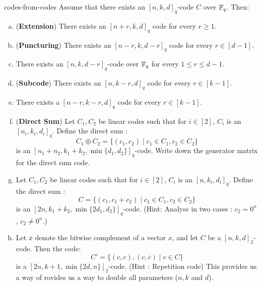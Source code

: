 \begin{exercise-prob}
\begin{show-ps5}{codes-from-codes}
Assume that there exists an $[n,k,d]_q$-code $C$ over
${\mathbb{F}}_q$. Then:
\begin{enumerate}[(a)]
\item ({\bf Extension}) There exists an $[n+r,k,d]_q$ code for every $r \ge 1$.
\item (\textbf{Puncturing}) There exists an $[n-r,k,d-r]_q$ code for every $r \in [d-1]$.
\item There exists an $[n,k,d-r]_q$-code over ${\mathbb{F}}_q$ for every $1 \le r \le d-1$.
\item ({\bf Subcode}) There exists an $[n,k-r,d]_q$ code for every $r \in [k-1]$.
\item There exists a $[n-r,k-r,d]_q$ code for every $r \in [k-1]$.
\item (\textbf{Direct Sum}) Let $C_1, C_2$ be linear codes such that for $i \in [2]$, $C_i$ is an $[n_i,k_i,d_i]_q$. Define the direct sum :
$$C_1 \oplus C_2 = \{(c_1,c_2)\mid c_1 \in C_1, c_2 \in C_2 \}$$
is an $[n_1+n_2,k_1+k_2,\min\{d_1,d_2\}]_q$-code. Write down the generator matrix for the direct sum code.
\item Let $C_1, C_2$ be linear codes such that for $i \in [2]$, $C_i$ is an $[n,k_i,d_i]_q$. Define the direct sum :
$$C = \{(c_1,c_1+c_2)\mid c_1 \in C_1, c_2 \in C_2 \}$$
is an $[2n,k_1+k_2,\min\{2d_1,d_2\}]_q$-code. (Hint: Analyse in two cases : $c_2=0^n$, $c_2 \ne 0^n$.)
\item Let $\overline{x}$ denote the bitwise complement of a vector $x$, and let $C$ be a $[n,k,d]_2$-code. Then the code:
$$C' = \{ (c,c),(c,\overline{c}) \mid c \in C \}$$
is a $[2n,k+1,\min\{2d,n\}]_2$-code. (Hint : Repetition code) This provides us a way of rovides us a way to double all parameters ($n,k$ and $d$).
\end{enumerate}
\end{show-ps5}
\end{exercise-prob}

